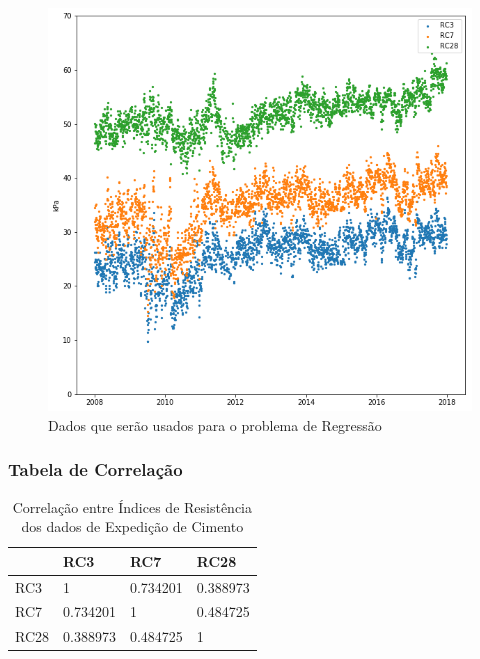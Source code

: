 \documentclass{beamer}
\begin{document}
\begin{frame}
\begin{figure}[H]
\centering
\includegraphics[scale=0.4]{slides_dados}
\caption{Dados que serão usados para o problema de Regressão}
\end{figure}

\end{frame}

\begin{frame}
\frametitle{Tabela de Correlação}
\begin{table}[H]
\centering
\begin{tabular}{l|lll}
\cline{2-4}
\textbf{}                  & \multicolumn{1}{l|}{RC3} & \multicolumn{1}{l|}{RC7} & \multicolumn{1}{l|}{RC28} \\ \hline
\multicolumn{1}{|l|}{RC3}  & 1                        & 0.734201                 & 0.388973                  \\ \cline{1-1}
\multicolumn{1}{|l|}{RC7}  & 0.734201                 & 1                        & 0.484725                  \\ \cline{1-1}
\multicolumn{1}{|l|}{RC28} & 0.388973                 & 0.484725                 & 1                         \\ \cline{1-1}
\end{tabular}
\caption{Correlação entre Índices de Resistência dos dados de
  Expedição de Cimento}
\label{corr3728}
\end{table}

\end{frame}
\end{document}
